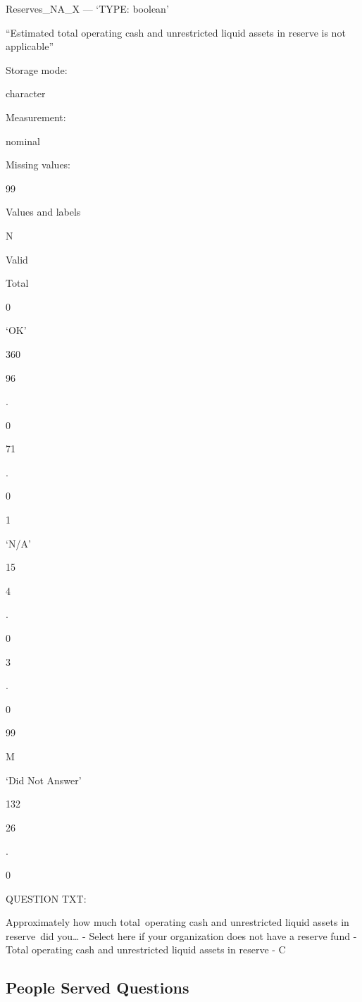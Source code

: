 \documentclass[
  letterpaper,
]{scrbook}
\begin{document}
Reserves\_NA\_X --- {`TYPE: boolean'}

``Estimated total operating cash and unrestricted liquid assets in
reserve is not applicable''

Storage mode:

character

Measurement:

nominal

Missing values:

99

Values and labels

N

Valid

Total

0

`OK'

360

96

.

0

71

.

0

1

`N/A'

15

4

.

0

3

.

0

99

M

`Did Not Answer'

132

26

.

0

QUESTION TXT:

Approximately how much total~operating cash and unrestricted liquid
assets in reserve~did you\ldots{} - Select here if your organization
does not have a reserve fund - Total operating cash and unrestricted
liquid assets in reserve - C

\subsection{People Served Questions}\label{people-served-questions}
\end{document}
